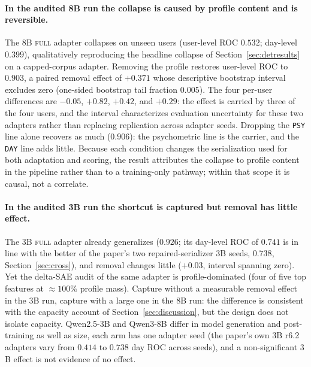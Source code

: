 \documentclass[10pt]{article} %
\newcommand{\rsix}{r6.2}
\begin{document}
\paragraph{In the audited 8B run the collapse is caused by profile content and is reversible.}
The $8$B \textsc{full} adapter collapses on unseen users (user-level ROC
$0.532$; day-level $0.399$), qualitatively reproducing the headline collapse of
Section~\ref{sec:detresults} on a capped-corpus adapter. Removing the profile
restores user-level ROC to $0.903$, a paired removal effect of $+0.371$ whose
descriptive bootstrap interval excludes zero (one-sided bootstrap tail
fraction $0.005$). The four per-user differences are $-0.05$, $+0.82$,
$+0.42$, and $+0.29$: the effect is carried by three of the four users, and
the interval characterizes evaluation uncertainty for these two adapters
rather than replacing replication across adapter seeds. Dropping the
\texttt{PSY} line alone recovers as much ($0.906$): the psychometric line is
the carrier, and the \texttt{DAY} line adds little. Because each condition
changes the serialization used for both adaptation and scoring, the result
attributes the collapse to profile content in the pipeline rather than to a
training-only pathway; within that scope it is causal, not a correlate.

\paragraph{In the audited 3B run the shortcut is captured but removal has little effect.}
The $3$B \textsc{full} adapter already generalizes ($0.926$; its day-level ROC
of $0.741$ is in line with the better of the paper's two repaired-serializer
$3$B seeds, $0.738$, Section~\ref{sec:cross}), and removal changes little
($+0.03$, interval spanning zero). Yet the delta-SAE audit of the same adapter
is profile-dominated (four of five top features at $\approx\!100\%$ profile
mass). Capture without a measurable removal effect in the $3$B run, capture
with a large one in the $8$B run: the difference is consistent with the
capacity account of Section~\ref{sec:discussion}, but the design does not
isolate capacity. Qwen2.5-3B and Qwen3-8B differ in model generation and
post-training as well as size, each arm has one adapter seed (the paper's own
$3$B \rsix{} adapters vary from $0.414$ to $0.738$ day ROC across seeds), and
a non-significant $3$B effect is not evidence of no effect.
\end{document}
